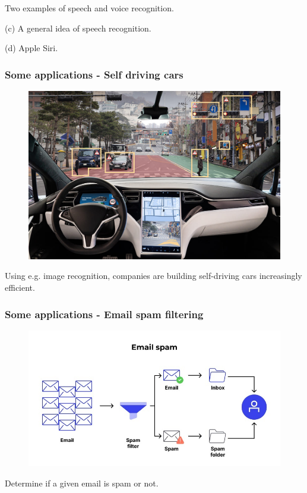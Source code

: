 \documentclass{beamer}
\begin{document}
\begin{frame}
\begin{figure}
		\end{figure}
	Two examples of speech and voice recognition. 
	
	(c) A general idea of speech recognition. 
	
	(d) Apple Siri.
	
	\end{frame}

	\begin{frame}
		\frametitle{Some applications - Self driving cars}
		\begin{figure}
			\centering
			\includegraphics[scale=0.3]{images/self-driving-1}
		\end{figure}
		Using e.g. image recognition, companies are building self-driving cars increasingly efficient.
		
	\end{frame}

	\begin{frame}
		\frametitle{Some applications - Email spam filtering}
		\begin{figure}
			\centering
			\includegraphics[scale=0.5]{images/spam-filtering-1}
		\end{figure}
		Determine if a given email is spam or not.
		
	\end{frame}
\end{document}
